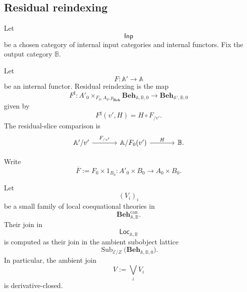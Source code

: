 \subsection{Residual reindexing}
\label{subsec:to-residual-reindexing}

Let
\[
    \mathsf{Inp}
\]
be a chosen category of internal input categories and internal functors. Fix
the output category \(\mathbb B\).

Let
\[
    F:\mathbb A'\to\mathbb A
\]
be an internal functor. Residual reindexing is the map
\[
    F^\sharp:
    A'_0
    \times_{F_0,A_0,p_{\mathbf{Beh}}}
    \mathbf{Beh}_{\mathbb A,\mathbb B,0}
    \to
    \mathbf{Beh}_{\mathbb A',\mathbb B,0}
\]
given by
\[
    F^\sharp(v',H)
    =
    H\circ F_{/v'}.
\]
The residual-slice comparison is
\[
\begin{tikzcd}[column sep=large]
    \mathbb A'/v'
        \arrow[r, "F_{/v'}"]
    &
    \mathbb A/F_0(v')
        \arrow[r, "H"]
    &
    \mathbb B.
\end{tikzcd}
\]

Write
\[
    \overline F
    :=
    F_0\times1_{B_0}:
    A'_0\times B_0
    \to
    A_0\times B_0.
\]

\begin{proposition}
\label{prop:to-local-theory-ambient-joins}
    Let
    \[
        (V_i)_i
    \]
    be a small family of local coequational theories in
    \[
        \mathbf{Beh}^{\mathrm{can}}_{\mathbb A,\mathbb B}.
    \]
    Their join in
    \[
        \mathsf{Loc}_{\mathbb A,\mathbb B}
    \]
    is computed as their join in the ambient subobject lattice
    \[
        \operatorname{Sub}_{\mathcal E/Z}
        \bigl(
            \mathbf{Beh}_{\mathbb A,\mathbb B,0}
        \bigr).
    \]
    In particular, the ambient join
    \[
        V:=\bigvee_iV_i
    \]
    is derivative-closed.
\end{proposition}

